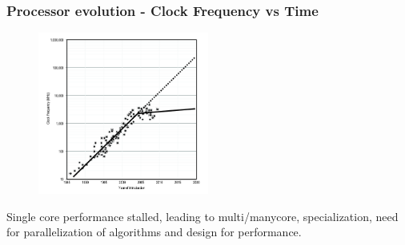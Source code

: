 \begin{frame}
\frametitle{Processor evolution - Clock Frequency vs Time}

\begin{figure}[htbp]
\begin{center}
\includegraphics[width=0.5\textwidth]{images/moore2.png}
\end{center}
\end{figure}

\small{Single core performance stalled, leading to multi/manycore, specialization, need for parallelization of algorithms and design for performance.}

\end{frame}


